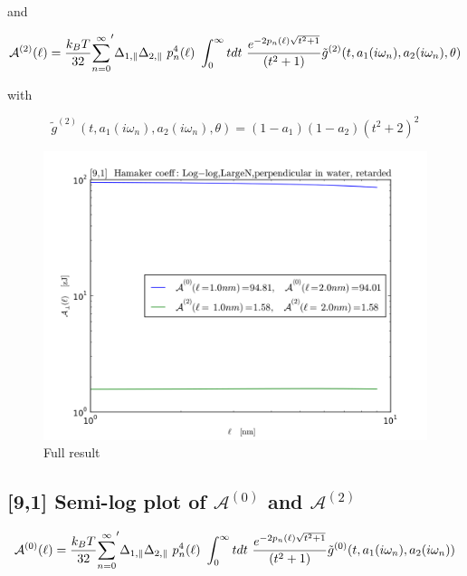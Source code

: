 \documentclass[a4paper]{article}
\begin{document}
\begin{center}

and

\begin{equation}
{\cal A}^{(2)}(\ell) = \frac{k_BT}{32}  {\sum_{n=0}^{\infty}}' \Delta_{1,\parallel} \Delta_{2,\parallel} ~p_n^{4}(\ell) ~\int_0^{\infty} t dt ~\frac{e^{- 2 p_n(\ell) \sqrt{t^{2} + 1}}}{(t^{2} + 1)} \tilde g^{(2)}(t, a_1(i \omega_n), a_2(i \omega_n), \theta)
\end{equation}

with

\begin{equation}
\tilde g^{(2)}(t, a_1(i \omega_n), a_2(i \omega_n), \theta) = (1-a_1)(1-a_2)(t^{2} + 2)^2
\label{befgqw}
\end{equation}

\begin{figure}[t!]
\begin{center}
\includegraphics[width=1.2\textwidth]{large_N/140322_91w91_HCs_perpendicular_ret_lrg_n.png}
\hskip 43pt
\caption{Full result}
\label{eiz65}
\end{center}
\end{figure} 

\subsection{[9,1] Semi-log plot of $\mathcal{A}^{(0)}$ and $\mathcal{A}^{(2)}$ }
\begin{equation}
{\cal A}^{(0)}(\ell) = \frac{k_BT}{32}  {\sum_{n=0}^{\infty}}' \Delta_{1,\parallel} \Delta_{2,\parallel} ~p_n^{4}(\ell) ~\int_0^{\infty} t dt ~\frac{e^{- 2 p_n(\ell) \sqrt{t^{2} + 1}}}{(t^{2} + 1)} \tilde g^{(0)}(t, a_1(i \omega_n), a_2(i \omega_n))
\end{equation}


\end{center}
\end{document}
